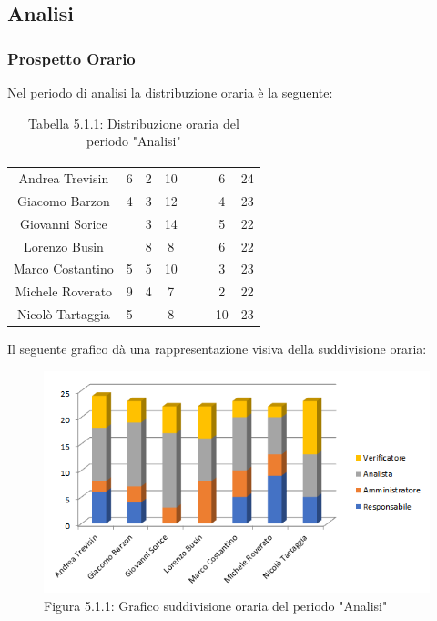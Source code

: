 \subsection{Analisi}

\subsubsection{Prospetto Orario}
Nel periodo di analisi la distribuzione oraria è la seguente:

\renewcommand{\arraystretch}{1.5}
\begin{table}[H]
\begin{center}
\begin{tabular}{|c|c|c|c|c|c|c|c|}
\hline
\rowcolor{title_row}
\textbf{\color{title_text}{Nome}} & \textbf{\color{title_text}{Resp.}} & \textbf{\color{title_text}{Ammi.}} & \textbf{\color{title_text}{Analist.}} & \textbf{\color{title_text}{Progett.}} & \textbf{\color{title_text}{Program.}} & \textbf{\color{title_text}{Verific.}} & \textbf{\color{title_text}{Totale}} \\ \hline
Andrea Trevisin  & 6 & 2 & 10 & & & 6 & 24  \\ \hline
Giacomo Barzon   & 4 & 3 & 12 & & & 4 & 23  \\ \hline
Giovanni Sorice  & & 3 & 14 & & & 5 & 22  \\ \hline
Lorenzo Busin    & & 8 & 8 & & & 6 & 22  \\ \hline
Marco Costantino & 5 & 5 & 10 & & & 3 & 23 \\ \hline
Michele Roverato & 9 & 4 & 7 & & & 2 & 22 \\ \hline
Nicolò Tartaggia & 5 & & 8 & & & 10 & 23  \\ \hline
\end{tabular}
\caption{Tabella 5.1.1: Distribuzione oraria del periodo "Analisi"\label{}}
\end{center}
\end{table}
\renewcommand{\arraystretch}{1}

Il seguente grafico dà una rappresentazione visiva della suddivisione oraria: \\
\begin{figure} [H]
	\centering
	\includegraphics[scale=1]{Res/ExcelGrafici/Grafici/AnalisiOre.png}
	\caption{Figura 5.1.1: Grafico suddivisione oraria del periodo "Analisi"}\label{}
\end{figure}


